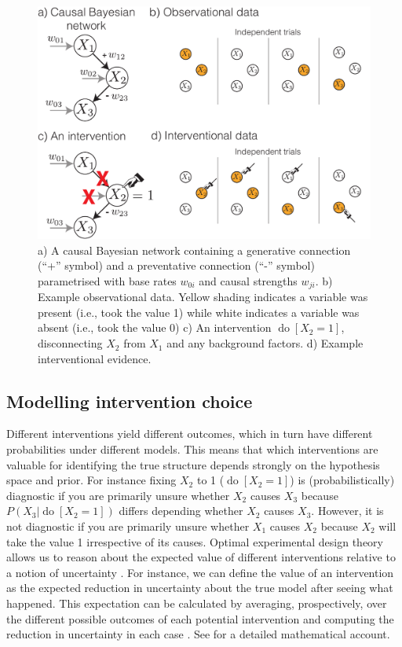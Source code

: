 \documentclass{cambridge7A}%
\DeclareMathOperator*{\Do}{do}
\begin{document}
\begin{figure}[t]
   \centering
   \includegraphics[width = .7\columnwidth]{CBN}
   \caption{a) A causal Bayesian network containing a generative connection (``+'' symbol) and a preventative connection (``-'' symbol) parametrised with base rates $w_{0i}$ and causal strengths $w_{ji}$.  b) Example observational data.  Yellow shading indicates a variable was present (i.e., took the value 1) while white indicates a variable was absent (i.e., took the value 0) c) An intervention $\Do[X_2 = 1]$, disconnecting $X_2$ from $X_1$ and any background factors. d) Example interventional evidence.
   }
   \label{fig:CBN}
\end{figure}

\subsection{Modelling intervention choice}

Different interventions yield different outcomes, which in turn have different probabilities under different models.  This means that which interventions are valuable for identifying the true structure depends strongly on the hypothesis space and prior.  For instance fixing $X_2$ to 1 ($\Do[X_2\!=\!1]$) is (probabilistically) diagnostic if you are primarily unsure whether $X_2$ causes $X_3$ because $P(X_3|\Do[X_2\!=\!1])$ differs depending whether $X_2$ causes $X_3$.  However, it is not diagnostic if you are primarily unsure whether $X_1$ causes $X_2$ because $X_2$ will take the value 1 irrespective of its causes.  Optimal experimental design theory allows us to reason about the expected value of different interventions relative to a notion of uncertainty \citep{fedorov1972theory,raiffa1974applied}.  For instance, we can define the value of an intervention as the expected reduction in uncertainty about the true model after seeing what happened. This expectation can be calculated by averaging, prospectively, over the different possible outcomes of each potential intervention and computing the reduction in uncertainty in each case \citep[e.g.,][]{shannon1951prediction}. See \cite{bramley2017neurath} for a detailed mathematical account.
\end{document}
